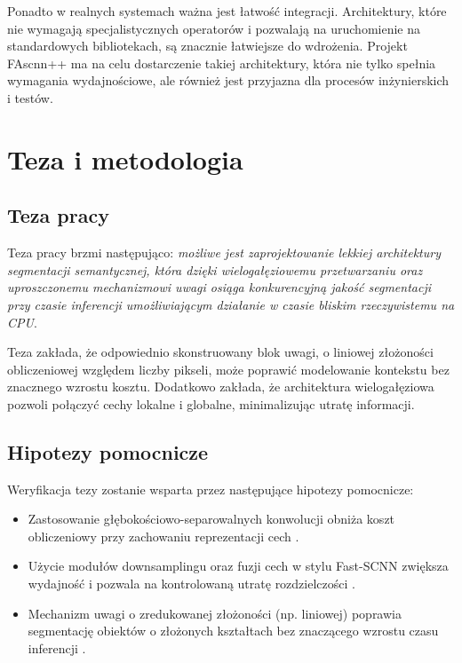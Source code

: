 \documentclass[12pt,oneside,a4paper]{report}
\begin{document}
Ponadto w realnych systemach ważna jest łatwość integracji. Architektury, które
nie wymagają specjalistycznych operatorów i pozwalają na uruchomienie na
standardowych bibliotekach, są znacznie łatwiejsze do wdrożenia. Projekt FAscnn++
ma na celu dostarczenie takiej architektury, która nie tylko spełnia wymagania
wydajnościowe, ale również jest przyjazna dla procesów inżynierskich i testów.

\chapter{Teza i metodologia}
\section{Teza pracy}
Teza pracy brzmi następująco: \emph{możliwe jest zaprojektowanie lekkiej
architektury segmentacji semantycznej, która dzięki wielogałęziowemu przetwarzaniu
oraz uproszczonemu mechanizmowi uwagi osiąga konkurencyjną jakość segmentacji
przy czasie inferencji umożliwiającym działanie w czasie bliskim rzeczywistemu
na CPU}.

Teza zakłada, że odpowiednio skonstruowany blok uwagi, o liniowej złożoności
obliczeniowej względem liczby pikseli, może poprawić modelowanie kontekstu bez
znacznego wzrostu kosztu. Dodatkowo zakłada, że architektura wielogałęziowa
pozwoli połączyć cechy lokalne i globalne, minimalizując utratę informacji.

\section{Hipotezy pomocnicze}
Weryfikacja tezy zostanie wsparta przez następujące hipotezy pomocnicze:
\begin{itemize}
  \item Zastosowanie głębokościowo-separowalnych konwolucji obniża koszt
        obliczeniowy przy zachowaniu reprezentacji cech \parencite{howard2017mobilenets,chollet2017xception}.
  \item Użycie modułów downsamplingu oraz fuzji cech w stylu Fast-SCNN zwiększa
        wydajność i pozwala na kontrolowaną utratę rozdzielczości
        \parencite{mehta2019fast}.
  \item Mechanizm uwagi o zredukowanej złożoności (np. liniowej) poprawia
        segmentację obiektów o złożonych kształtach bez znaczącego wzrostu czasu
        inferencji \parencite{katharopoulos2020transformers,wang2020linformer}.
\end{itemize}
\end{document}
